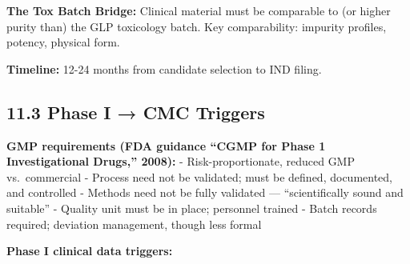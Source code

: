 \documentclass[
  11pt,
  a4paper,
]{report}
\begin{document}
\textbf{The Tox Batch Bridge:} Clinical material must be comparable to
(or higher purity than) the GLP toxicology batch. Key comparability:
impurity profiles, potency, physical form.

\textbf{Timeline:} 12-24 months from candidate selection to IND filing.

\hypertarget{phase-i-cmc-triggers}{%
\subsection{11.3 Phase I → CMC Triggers}\label{phase-i-cmc-triggers}}

\textbf{GMP requirements (FDA guidance ``CGMP for Phase 1
Investigational Drugs,'' 2008):} - Risk-proportionate, reduced GMP
vs.~commercial - Process need not be validated; must be defined,
documented, and controlled - Methods need not be fully validated ---
``scientifically sound and suitable'' - Quality unit must be in place;
personnel trained - Batch records required; deviation management, though
less formal

\textbf{Phase I clinical data triggers:}
\end{document}
